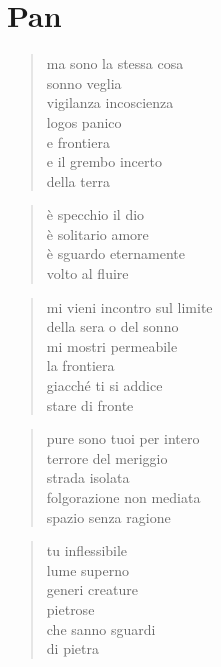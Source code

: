\chapter{Pan}


\begin{verse}
    ma sono la stessa cosa\\
    sonno veglia\\
    vigilanza incoscienza\\
    logos panico\\
    e frontiera\\
    e il grembo incerto\\
    della terra
\end{verse}

\clearpage


\begin{verse}
    è specchio il dio\\
    è solitario amore\\
    è sguardo eternamente\\
    volto al fluire
\end{verse}

\clearpage


\begin{verse}
    mi vieni incontro sul limite\\
    della sera o del sonno\\
    mi mostri permeabile\\
    la frontiera\\
    giacché ti si addice\\
    stare di fronte
\end{verse}

\begin{verse}
    pure sono tuoi per intero\\
    terrore del meriggio\\
    strada isolata\\
    folgorazione non mediata\\
    spazio senza ragione
\end{verse}

\begin{verse}
    tu inflessibile\\
    lume superno\\
    generi creature\\
    pietrose\\
    che sanno sguardi\\
    di pietra
\end{verse}

